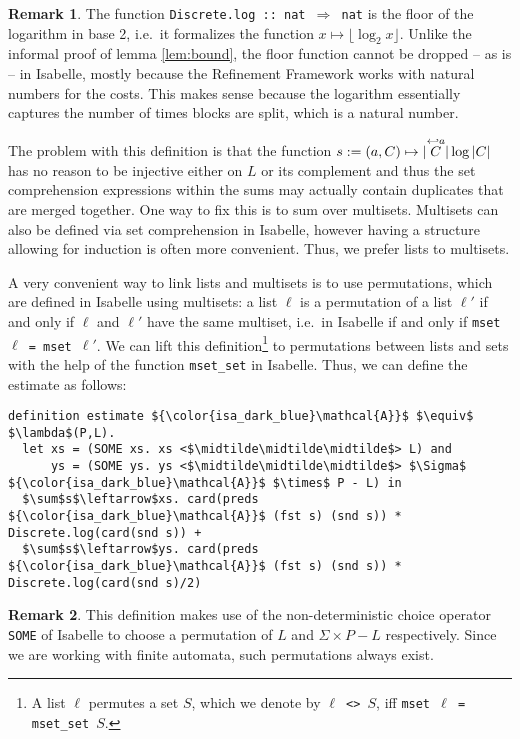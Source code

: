 \documentclass[12pt, a4 paper]{article}
\newcommand{\midtilde}{\raisebox{0.5ex}{\texttildelow}}
\theoremstyle{definition}
\newtheorem{remark}{Remark}
\begin{document}
\begin{remark}
    The function \texttt{Discrete.log :: nat $\Rightarrow$ nat} is the floor of the logarithm in base 2, i.e.\ it formalizes the function $x \mapsto \lfloor \log_2 x \rfloor$. Unlike the informal proof of lemma \ref{lem:bound}, the floor function cannot be dropped -- as is -- in Isabelle, mostly because the Refinement Framework works with natural numbers for the costs. This makes sense because the logarithm essentially captures the number of times blocks are split, which is a natural number.
\end{remark}

The problem with this definition is that the function $s := (a, C) \mapsto |\overset{\hookleftarrow {a}}{C}| \log |C|$ has no reason to be injective either on $L$ or its complement and thus the set comprehension expressions within the sums may actually contain duplicates that are merged together. One way to fix this is to sum over multisets. Multisets can also be defined via set comprehension in Isabelle, however having a structure allowing for induction is often more convenient. Thus, we prefer lists to multisets. 

\bigskip

A very convenient way to link lists and multisets is to use permutations, which are defined in Isabelle using multisets: a list $\ell$ is a permutation of a list $\ell'$ if and only if $\ell$ and $\ell'$ have the same multiset, i.e.\ in Isabelle if and only if \texttt{mset $\ell$ = mset $\ell'$}. We can lift this definition\footnote{A list $\ell$ permutes a set $S$, which we denote by \texttt{$\ell$ <\midtilde\midtilde\midtilde> $S$}, iff \texttt{mset $\ell$ = mset\_set $S$}.} to permutations between lists and sets with the help of the function \texttt{mset\_set} in Isabelle. Thus, we can define the estimate as follows:

\begin{lstlisting}[language=Isabelle]
definition estimate ${\color{isa_dark_blue}\mathcal{A}}$ $\equiv$ $\lambda$(P,L).
  let xs = (SOME xs. xs <$\midtilde\midtilde\midtilde$> L) and
      ys = (SOME ys. ys <$\midtilde\midtilde\midtilde$> $\Sigma$ ${\color{isa_dark_blue}\mathcal{A}}$ $\times$ P - L) in
  $\sum$s$\leftarrow$xs. card(preds ${\color{isa_dark_blue}\mathcal{A}}$ (fst s) (snd s)) * Discrete.log(card(snd s)) +
  $\sum$s$\leftarrow$ys. card(preds ${\color{isa_dark_blue}\mathcal{A}}$ (fst s) (snd s)) * Discrete.log(card(snd s)/2)
\end{lstlisting}

\begin{remark}
    This definition makes use of the non-deterministic choice operator \texttt{SOME} of Isabelle to choose a permutation of $L$ and $\Sigma \times P - L$ respectively. Since we are working with finite automata, such permutations always exist.
\end{remark}
\end{document}
